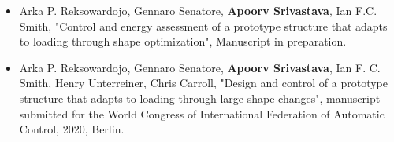 
\begin{itemize}
    \item Arka P. Reksowardojo, Gennaro Senatore, \textbf{Apoorv Srivastava}, Ian F.C. Smith, "Control and energy assessment of a prototype structure that adapts to loading through shape optimization", Manuscript in preparation.
    \item Arka P. Reksowardojo, Gennaro Senatore, \textbf{Apoorv Srivastava}, Ian F. C. Smith, Henry Unterreiner, Chris Carroll, "Design and control of a prototype structure that adapts to loading through large shape changes", manuscript submitted for the World Congress of International Federation of Automatic Control, 2020, Berlin.
\end{itemize}